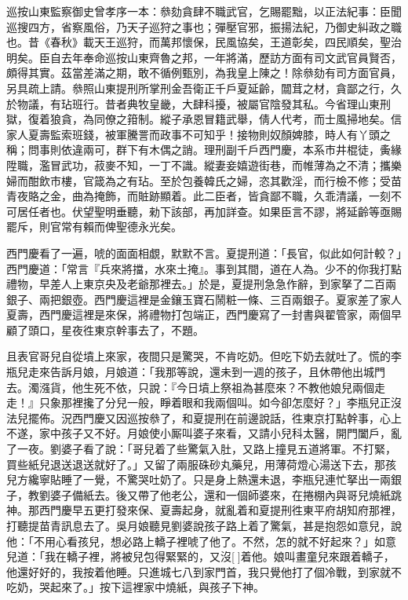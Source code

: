 巡按山東監察御史曾孝序一本：叅劾貪肆不職武官，乞賜罷黜，以正法紀事：臣聞巡搜四方，省察風俗，乃天子巡狩之事也；彈壓官邪，振揚法紀，乃御史糾政之職也。昔《春秋》載天王巡狩，而萬邦懷保，民風協矣，王道彰矣，四民順矣，聖治明矣。臣自去年奉命巡按山東齊魯之邦，一年將滿，歷訪方面有司文武官員賢否，頗得其實。茲當差滿之期，敢不循例甄別，為我皇上陳之！除叅劾有司方面官員，另具疏上請。叅照山東提刑所掌刑金吾衛正千戶夏延齡，闒茸之材，貪鄙之行，久於物議，有玷班行。昔者典牧皇畿，大肆科擾，被屬官陰發其私。今省理山東刑獄，復着狼貪，為同僚之箝制。縱子承恩冒籍武舉，倩人代考，而士風掃地矣。信家人夏壽監索班錢，被軍騰詈而政事不可知乎！接物則奴顏婢膝，時人有丫頭之稱；問事則依違兩可，群下有木偶之誚。理刑副千戶西門慶，本系市井棍徒，夤緣陞職，濫冒武功，菽麥不知，一丁不識。縱妻妾嬉遊街巷，而帷薄為之不清；攜樂婦而酣飲市樓，官箴為之有玷。至於包養韓氏之婦，恣其歡淫，而行檢不修；受苗青夜賂之金，曲為掩飾，而賍跡顯着。此二臣者，皆貪鄙不職，久乖清議，一刻不可居任者也。伏望聖明垂聽，勑下該部，再加詳查。如果臣言不謬，將延齡等亟賜罷斥，則官常有賴而俾聖德永光矣。

西門慶看了一遍，唬的面面相覷，默默不言。夏提刑道：「長官，似此如何計較？」西門慶道：「常言『兵來將擋，水來土掩』。事到其間，道在人為。少不的你我打點禮物，早差人上東京央及老爺那裡去。」於是，夏提刑急急作辭，到家拏了二百兩銀子、兩把銀壺。西門慶這裡是金鑲玉寶石鬧粧一條、三百兩銀子。夏家差了家人夏壽，西門慶這裡是來保，將禮物打包端正，西門慶寫了一封書與翟管家，兩個早顧了頭口，星夜徃東京幹事去了，不題。

且表官哥兒自從墳上來家，夜間只是驚哭，不肯吃奶。但吃下奶去就吐了。慌的李瓶兒走來告訴月娘，月娘道：「我那等說，還未到一週的孩子，且休帶他出城門去。濁漒貨，他生死不依，只說：『今日墳上祭祖為甚麼來？不教他娘兒兩個走走！』只象那裡攙了分兒一般，睜着眼和我兩個叫。如今卻怎麼好？」{}李瓶兒正沒法兒擺佈。況西門慶又因巡按叅了，和夏提刑在前邊說話，徃東京打點幹事，心上不遂，家中孩子又不好。月娘使小厮叫婆子來看，又請小兒科太醫，開門闔戶，亂了一夜。劉婆子看了說：「哥兒着了些驚氣入肚，又路上撞見五道將軍。不打緊，買些紙兒退送退送就好了。」又留了兩服硃砂丸藥兒，用薄荷燈心湯送下去，那孩兒方纔寧貼睡了一覺，不驚哭吐奶了。只是身上熱還未退，李瓶兒連忙拏出一兩銀子，教劉婆子備紙去。後又帶了他老公，還和一個師婆來，在捲棚內與哥兒燒紙跳神。那西門慶早五更打發來保、夏壽起身，就亂着和夏提刑徃東平府胡知府那裡，打聽提苗青訊息去了。吳月娘聽見劉婆說孩子路上着了驚氣，甚是抱怨如意兒，{}說他：「不用心看孩兒，想必路上轎子裡唬了他了。不然，怎的就不好起來？」如意兒道：「我在轎子裡，將被兒包得緊緊的，又沒[]着他。娘叫畫童兒來跟着轎子，他還好好的，我按着他睡。只進城七八到家門首，我只覺他打了個冷戰，到家就不吃奶，哭起來了。」{}按下這裡家中燒紙，與孩子下神。

